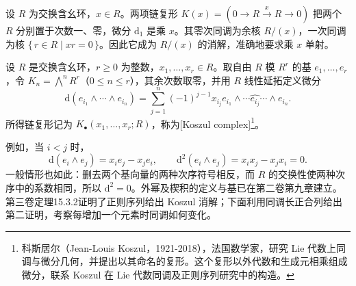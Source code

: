 设 \(R\) 为交换含幺环，\(x\in R\)。两项链复形 \(K(x)=(0\to R\xrightarrow{x}R\to0)\) 把两个 \(R\) 分别置于次数一、零，微分 \(\mathrm{d}_1\) 是乘 \(x\)。其零次同调为余核 \(R/(x)\)，一次同调为核 \(\{\,r\in R\mid xr=0\,\}\)。因此它成为 \(R/(x)\) 的消解，准确地要求乘 \(x\) 单射。

\begin{definition}\label{b4:def:koszul-preview}
	设 \(R\) 是交换含幺环，\(r\ge0\) 为整数，\(x_1,\ldots,x_r\in R\)。取自由 \(R\) 模 \(R^r\) 的基 \(e_1,\ldots,e_r\)，令 \(K_n=\bigwedge^nR^r\)（\(0\le n\le r\)），其余次数取零，并用 \(R\) 线性延拓定义微分
	\[
		\mathrm{d}(e_{i_1}\wedge\cdots\wedge e_{i_n}) =\sum_{j=1}^n(-1)^{j-1}x_{i_j} e_{i_1}\wedge\cdots\widehat{e_{i_j}}\cdots\wedge e_{i_n}.
	\]
	所得链复形记为 \(K_\bullet(x_1,\ldots,x_r;R)\)，称为[Koszul complex]\footnote{科斯居尔（Jean-Louis Koszul，1921-2018），法国数学家，研究 Lie 代数上同调与微分几何，并提出以其命名的复形。这个复形以外代数和生成元相乘组成微分，联系 Koszul 在 Lie 代数同调及正则序列研究中的构造。}。
\end{definition}

例如，当 \(i<j\) 时，
\[
	\mathrm{d}(e_i\wedge e_j)=x_ie_j-x_je_i, \qquad \mathrm{d}^2(e_i\wedge e_j)=x_ix_j-x_jx_i=0.
\]
一般情形也如此：删去两个基向量的两种次序符号相反，而 \(R\) 的交换性使两种次序中的系数相同，所以 \(\mathrm{d}^2=0\)。外幂及楔积的定义与基已在第二卷第九章建立。第三卷定理15.3.2证明了正则序列给出 Koszul 消解；下面利用同调长正合列给出第二证明，考察每增加一个元素时同调如何变化。

